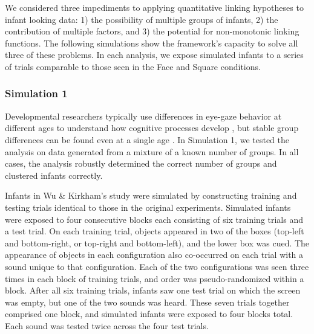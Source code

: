 \documentclass[12pt]{article}
\begin{document}
	We considered three impediments to applying quantitative linking hypotheses to infant looking data: 1) the possibility of multiple groups of infants, 2) the contribution of multiple factors, and 3) the potential for non-monotonic linking functions. The following simulations show the framework's capacity to solve all three of these problems. In each analysis, we expose simulated infants to a series of trials comparable to those seen in the Face and Square conditions. 

\subsubsection*{Simulation 1}
 
	Developmental researchers typically use differences in eye-gaze behavior at different ages to understand how cognitive processes develop \cite{Halberda2003, Kidd2011}, but stable group differences can be found even at a single age \cite{Cashon2000, Yu2011a}. In Simulation 1, we tested the analysis on data generated from a mixture of a known number of groups. In all cases, the analysis robustly determined the correct number of groups and clustered infants correctly.

	Infants in Wu \& Kirkham's \cite{Wu2010a} study were simulated by constructing training and testing trials identical to those in the original experiments. Simulated infants were exposed to four consecutive blocks each consisting of six training trials and a test trial. On each training trial, objects appeared in two of the boxes (top-left and bottom-right, or top-right and bottom-left), and the lower box was cued. The appearance of objects in each configuration also co-occurred on each trial with a sound unique to that configuration. Each of the two configurations was seen three times in each block of training trials, and order was pseudo-randomized within a block. After all six training trials, infants saw one test trial on which the screen was empty, but one of the two sounds was heard. These seven trials together comprised one block, and simulated infants were exposed to four blocks total. Each sound was tested twice across the four test trials.
\end{document}
